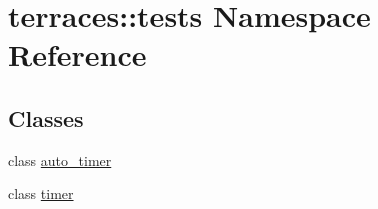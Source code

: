 \hypertarget{namespaceterraces_1_1tests}{}\section{terraces\+:\+:tests Namespace Reference}
\label{namespaceterraces_1_1tests}
\subsection*{Classes}
\begin{DoxyCompactItemize}
\item 
class \hyperlink{classterraces_1_1tests_1_1auto__timer}{auto\+\_\+timer}
\item 
class \hyperlink{classterraces_1_1tests_1_1timer}{timer}
\end{DoxyCompactItemize}
